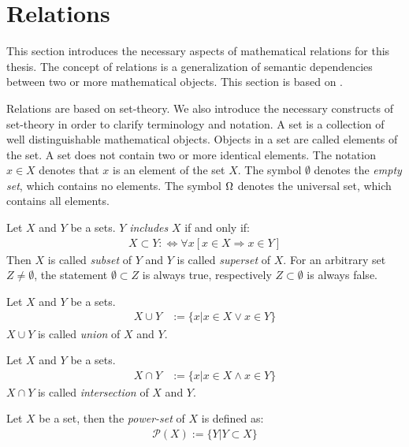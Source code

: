\section{Relations}
This section introduces the necessary aspects of mathematical relations for this thesis.
The concept of relations is a generalization of semantic dependencies between two or more mathematical objects.
This section is based on \cite{DBLP:books/sp/SchmidtS89}.

Relations are based on set-theory. We also introduce the necessary constructs of set-theory in order to clarify terminology and notation.
A set is a collection of well distinguishable mathematical objects.
Objects in a set are called elements of the set.
A set does not contain two or more identical elements.
The notation $x \in X$ denotes that $x$ is an element of the set $X$.
The symbol $\emptyset$ denotes the \emph{empty set}, which contains no elements.
The symbol $\Omega$ denotes the universal set, which contains all elements.

\begin{definition}[Inclusion]
\label{definition:Inclusion}
Let $X$ and $Y$ be a sets.
$Y$ \emph{includes} $X$ if and only if:
\begin{align}
X \subset Y :\Leftrightarrow \forall x [x \in X \Rightarrow x \in Y]
\end{align}
Then $X$ is called \emph{subset} of $Y$ and $Y$ is called \emph{superset} of $X$.
For an arbitrary set $Z \neq \emptyset$, the statement $\emptyset \subset Z$ is always true, respectively $Z \subset \emptyset$ is always false.
\end{definition}

\begin{definition}[Union]
Let $X$ and $Y$ be a sets.
\begin{align}
X \cup Y &:= \{ x | x \in X \vee x \in Y \} 
\end{align}
$X \cup Y$ is called \emph{union} of $X$ and $Y$.
\end{definition}

\begin{definition}[Intersection]
Let $X$ and $Y$ be a sets.
\begin{align}
X \cap Y &:= \{ x | x \in X \wedge x \in Y \} 
\end{align}
$X \cap Y$ is called \emph{intersection} of $X$ and $Y$.
\end{definition}

\begin{definition}
\label{definition:PowerSet}
Let $X$ be a set, then the \emph{power-set} of $X$ is defined as:
\begin{align}
\mathcal{P}(X) := \{ Y | Y \subset X \}
\end{align}
\end{definition}

